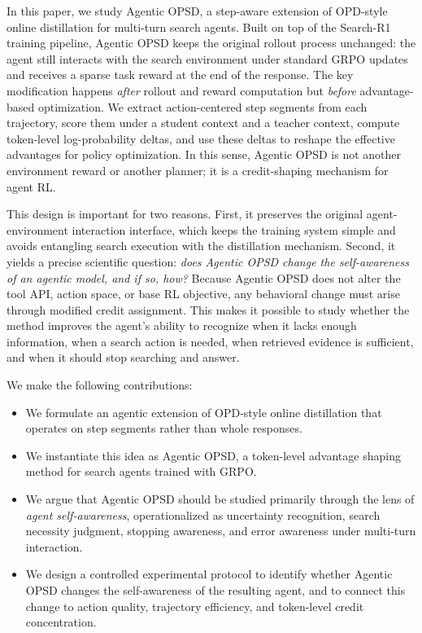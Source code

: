\documentclass[11pt]{article}
\newcommand{\method}{Agentic OPSD}
\newcommand{\grpo}{GRPO}
\newcommand{\searchr}{Search-R1}
\begin{document}
In this paper, we study \method, a step-aware extension of OPD-style online distillation for multi-turn search agents. Built on top of the \searchr{} training pipeline, \method{} keeps the original rollout process unchanged: the agent still interacts with the search environment under standard \grpo{} updates and receives a sparse task reward at the end of the response. The key modification happens \emph{after} rollout and reward computation but \emph{before} advantage-based optimization. We extract action-centered step segments from each trajectory, score them under a student context and a teacher context, compute token-level log-probability deltas, and use these deltas to reshape the effective advantages for policy optimization. In this sense, \method{} is not another environment reward or another planner; it is a credit-shaping mechanism for agent RL.

This design is important for two reasons. First, it preserves the original agent-environment interaction interface, which keeps the training system simple and avoids entangling search execution with the distillation mechanism. Second, it yields a precise scientific question: \emph{does Agentic OPSD change the self-awareness of an agentic model, and if so, how?} Because \method{} does not alter the tool API, action space, or base RL objective, any behavioral change must arise through modified credit assignment. This makes it possible to study whether the method improves the agent's ability to recognize when it lacks enough information, when a search action is needed, when retrieved evidence is sufficient, and when it should stop searching and answer.

We make the following contributions:
\begin{itemize}[leftmargin=1.5em]
    \item We formulate an agentic extension of OPD-style online distillation that operates on step segments rather than whole responses.
    \item We instantiate this idea as \method{}, a token-level advantage shaping method for search agents trained with \grpo{}.
    \item We argue that \method{} should be studied primarily through the lens of \emph{agent self-awareness}, operationalized as uncertainty recognition, search necessity judgment, stopping awareness, and error awareness under multi-turn interaction.
    \item We design a controlled experimental protocol to identify whether \method{} changes the self-awareness of the resulting agent, and to connect this change to action quality, trajectory efficiency, and token-level credit concentration.
\end{itemize}
\end{document}

